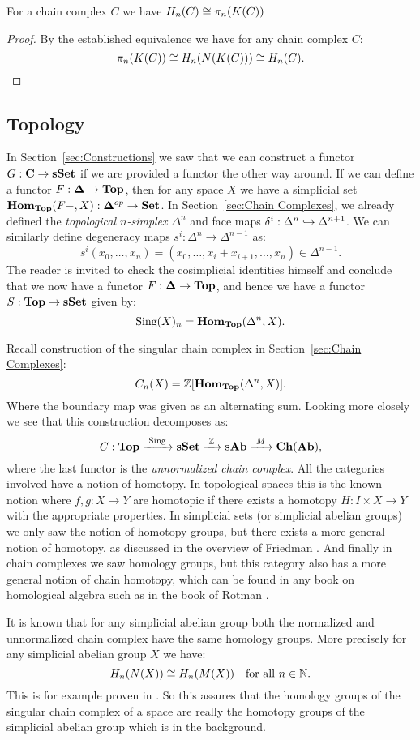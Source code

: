 \begin{corollary}
	For a chain complex $C$ we have $H_n(C) \cong \pi_n(K(C))$
\end{corollary}
\begin{proof}
	By the established equivalence we have for any chain complex $C$:
	$$ \pi_n(K(C)) \cong H_n(N(K(C))) \cong H_n(C). $$
\end{proof}

\subsection{Topology}
In Section~\ref{sec:Constructions} we saw that we can construct a functor $G: \mathbf{C} \to \mathbf{sSet}$ if we are provided a functor the other way around. If we can define a functor $F: \mathbf{\Delta} \to \mathbf{Top}$, then for any space $X$ we have a simplicial set $\mathbf{Hom}_{\mathbf{Top}}(F-, X): \mathbf{\Delta}^{op} \to \mathbf{Set}$. In Section~\ref{sec:Chain Complexes}, we already defined the \emph{topological $n$-simplex} $\Delta^n$ and face maps $\delta^i : \Delta^n \hookrightarrow \Delta^{n+1}$. We can similarly define degeneracy maps $s^i: \Delta^n \to \Delta^{n-1}$ as:
$$ s^i(x_0, \ldots, x_n) = (x_0, \ldots, x_i + x_{i+1}, \ldots, x_n) \in \Delta^{n-1}. $$
The reader is invited to check the cosimplicial identities himself and conclude that we now have a functor $F: \mathbf{\Delta} \to \mathbf{Top}$, and hence we have a functor $S: \mathbf{Top} \to \mathbf{sSet}$ given by:
$$ \text{Sing}(X)_n = \mathbf{Hom}_{\mathbf{Top}}(\Delta^n, X). $$

Recall construction of the singular chain complex in Section~\ref{sec:Chain Complexes}:
$$ C_n(X) = \mathbb{Z}[\mathbf{Hom}_{\mathbf{Top}}(\Delta^n, X)]. $$
Where the boundary map was given as an alternating sum. Looking more closely we see that this construction decomposes as:
$$ C: \mathbf{Top} \xrightarrow{\,\,{\text{Sing}}\,\,} \mathbf{sSet} \xrightarrow{\,\,{\mathbb{Z}}\,\,} \mathbf{sAb} \xrightarrow{\,\,{M}\,\,} \mathbf{Ch}(\mathbf{Ab}), $$
where the last functor is the \emph{unnormalized chain complex}. All the categories involved have a notion of homotopy. In topological spaces this is the known notion where $f, g:X \to Y$ are homotopic if there exists a homotopy $H:I \times X \to Y$ with the appropriate properties. In simplicial sets (or simplicial abelian groups) we only saw the notion of homotopy groups, but there exists a more general notion of homotopy, as discussed in the overview of Friedman \cite{friedman}. And finally in chain complexes we saw homology groups, but this category also has a more general notion of chain homotopy, which can be found in any book on homological algebra such as in the book of Rotman \cite{rotman}.

It is known that for any simplicial abelian group both the normalized and unnormalized chain complex have the same homology groups. More precisely for any simplicial abelian group $X$ we have:
$$ H_n(N(X)) \cong H_n(M(X)) \quad\text{for all } n \in \mathbb{N}. $$
This is for example proven in \cite[Theorem 4.1]{eilenberg}. So this assures that the homology groups of the singular chain complex of a space are really the homotopy groups of the simplicial abelian group which is in the background.
